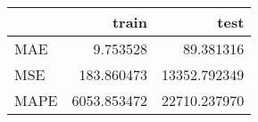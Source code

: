 \begin{tabular}{lrr}
\toprule
{} &        train &          test \\
\midrule
MAE  &     9.753528 &     89.381316 \\
MSE  &   183.860473 &  13352.792349 \\
MAPE &  6053.853472 &  22710.237970 \\
\bottomrule
\end{tabular}
